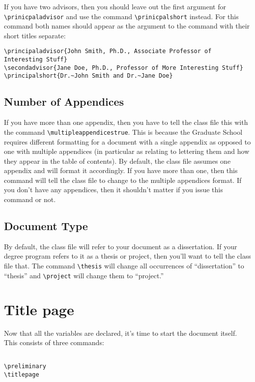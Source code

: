 If you have two advisors, then you should leave out the first argument for \verb=\prinicpaladvisor= and use the command \verb=\prinicpalshort= instead.  For this command both names should appear as the argument to the command with their short titles separate:

\begin{verbatim}
\principaladvisor{John Smith, Ph.D., Associate Professor of Interesting Stuff}
\secondadvisor{Jane Doe, Ph.D., Professor of More Interesting Stuff}
\principalshort{Dr.~John Smith and Dr.~Jane Doe}
\end{verbatim}

\subsection{Number of Appendices}
If you have more than one appendix, then you have to tell the class file this with the command \verb=\multipleappendicestrue=.  This is because the Graduate School requires different formatting for a document with a single appendix as opposed to one with multiple appendices (in particular as relating to lettering them and how they appear in the table of contents).  By default, the class file assumes one appendix and will format it accordingly.  If you have more than one, then this command will tell the class file to change to the multiple appendices format.  If you don't have any appendices, then it shouldn't matter if you issue this command or not.

\subsection{Document Type}
By default, the class file will refer to your document as a dissertation.  If your degree program refers to it as a thesis or project, then you'll want to tell the class file that.  The command \verb=\thesis= will change all occurrences of ``dissertation'' to ``thesis'' and \verb=\project= will change them to ``project.''

\section{Title page}

Now that all the variables are declared, it's time to start the document itself.  This consists of three commands:

\begin{verbatim}

\preliminary
\titlepage
\end{verbatim}

